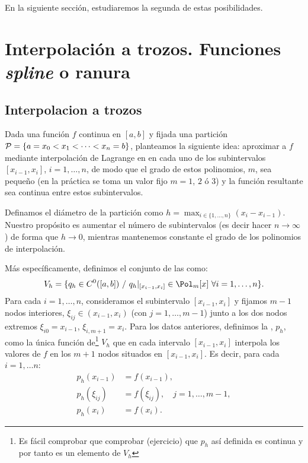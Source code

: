 En la siguiente sección, estudiaremos la segunda de estas
posibilidades.

\section{Interpolación a trozos. Funciones \textit{spline} o ranura}
\label{sec:interp-trozos-splines}

\subsection{Interpolacion a trozos}
\label{sec:interpolacion-trozos}


Dada una función $f$ continua en $[a,b]$ y fijada una partición
${\cal P}=\{a=x_0<x_1<\cdots<x_n=b\}$, planteamos la siguiente idea:
aproximar a $f$ mediante interpolación de Lagrange en en cada uno de
los subintervalos $[x_{i-1},x_{i}]$, $i=1,\dots,n$, de modo que el grado
de estos polinomios, $m$, sea pequeño (en la práctica se toma un valor
fijo $m=1$, $2$ ó $3$) y la función resultante sea continua entre
estos subintervalos.

Definamos el diámetro de la partición como
$h=\max_{i\in\{1,\dots,n\}}(x_i-x_{i-1})$. Nuestro propósito es aumentar
el número de subintervalos (es decir hacer $n\to \infty$) de forma
que $h\to 0$, mientras mantenemos constante el grado de los polinomios
de interpolación.

Más específicamente, definimos el conjunto de las  como:
\begin{equation*}
  V_h = \{ q_h\in C^0([a,b]) \ /\ q_h|_{[x_{i-1},x_{i}]}\in \Pol_m[x]\
  \forall i=1,\dots,n \}.
\end{equation*}
Para cada $i=1,\dots,n$, consideramos el subintervalo $[x_{i-1},x_i]$
y fijamos $m-1$ nodos interiores, $\xi_{ij}\in (x_{i-1},x_i)$ (con
$j=1,\dots,m-1$) junto a los dos nodos extremos $\xi_{i0}=x_{i-1}$,
$\xi_{i,m+1}={x_i}$.  Para los datos anteriores, definimos la
, $p_h$, como
la única función de\footnote{Es fácil comprobar que comprobar
  (ejercicio) que $p_h$ así definida es continua y por tanto es un
  elemento de $V_h$}  $V_h$ que en cada intervalo $[x_{i-1},x_i]$ interpola
los valores de $f$ en los $m+1$ nodos situados en $[x_{i-1}, x_{i}]$.
Es decir, para cada $i=1,\dots n$:
\begin{align*}
  p_h(x_{i-1})&=f(x_{i-1}),\\
  p_h(\xi_{ij})&=f(\xi_{ij}), \quad j=1,\dots,m-1,\\
  p_h(x_i)&=f(x_i).
\end{align*}

